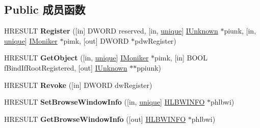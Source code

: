 \subsection*{Public 成员函数}
\begin{DoxyCompactItemize}
\item 
\mbox{\label{interface_i_hlink_browse_context_a5f30b76aa729d8ac5635346784dc2c57}} 
H\+R\+E\+S\+U\+LT {\bfseries Register} (\mbox{[}in\mbox{]} D\+W\+O\+RD reserved, \mbox{[}in, \hyperlink{interfaceunique}{unique}\mbox{]} \hyperlink{interface_i_unknown}{I\+Unknown} $\ast$piunk, \mbox{[}in, \hyperlink{interfaceunique}{unique}\mbox{]} \hyperlink{interface_i_moniker}{I\+Moniker} $\ast$pimk, \mbox{[}out\mbox{]} D\+W\+O\+RD $\ast$pdw\+Register)
\item 
\mbox{\label{interface_i_hlink_browse_context_a43fd8a789877ac55195d912bd2535251}} 
H\+R\+E\+S\+U\+LT {\bfseries Get\+Object} (\mbox{[}in, \hyperlink{interfaceunique}{unique}\mbox{]} \hyperlink{interface_i_moniker}{I\+Moniker} $\ast$pimk, \mbox{[}in\mbox{]} B\+O\+OL f\+Bind\+If\+Root\+Registered, \mbox{[}out\mbox{]} \hyperlink{interface_i_unknown}{I\+Unknown} $\ast$$\ast$ppiunk)
\item 
\mbox{\label{interface_i_hlink_browse_context_ac336649e0b318acdfb61acdf577e06b6}} 
H\+R\+E\+S\+U\+LT {\bfseries Revoke} (\mbox{[}in\mbox{]} D\+W\+O\+RD dw\+Register)
\item 
\mbox{\label{interface_i_hlink_browse_context_a928c1533ec80613c50c23f8c130bb22b}} 
H\+R\+E\+S\+U\+LT {\bfseries Set\+Browse\+Window\+Info} (\mbox{[}in, \hyperlink{interfaceunique}{unique}\mbox{]} \hyperlink{struct_i_hlink_browse_context_1_1__tag_h_l_b_w_i_n_f_o}{H\+L\+B\+W\+I\+N\+FO} $\ast$phlbwi)
\item 
\mbox{\label{interface_i_hlink_browse_context_a1b3fd91c403c4b3ff7e5c4187bd89a59}} 
H\+R\+E\+S\+U\+LT {\bfseries Get\+Browse\+Window\+Info} (\mbox{[}out\mbox{]} \hyperlink{struct_i_hlink_browse_context_1_1__tag_h_l_b_w_i_n_f_o}{H\+L\+B\+W\+I\+N\+FO} $\ast$phlbwi)
\item 
\mbox{\label{interface_i_hlink_browse_context_ae4910bdd75c1a80639babaf7bd416357}} 
$$
\end{DoxyCompactItemize}
